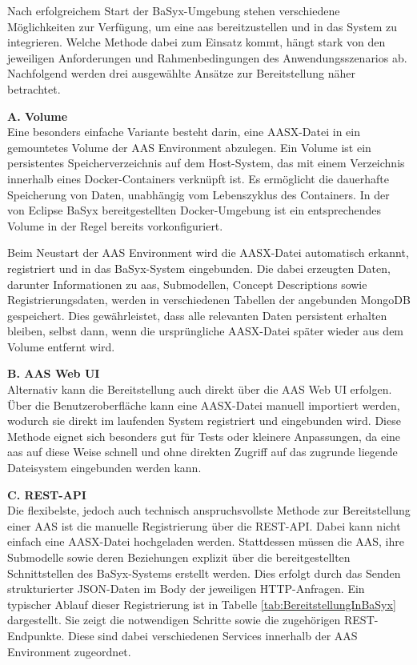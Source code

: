 Nach erfolgreichem Start der BaSyx-Umgebung stehen verschiedene Möglichkeiten zur Verfügung, um eine \acs{aas} bereitzustellen und in das System zu integrieren. 
Welche Methode dabei zum Einsatz kommt, hängt stark von den jeweiligen Anforderungen und Rahmenbedingungen des Anwendungsszenarios ab.
Nachfolgend werden drei ausgewählte Ansätze zur Bereitstellung näher betrachtet.

\noindent\textbf{A. Volume}\\
Eine besonders einfache Variante besteht darin, eine AASX-Datei in ein gemountetes Volume der AAS Environment abzulegen.
Ein Volume ist ein persistentes Speicherverzeichnis auf dem Host-System, das mit einem Verzeichnis innerhalb eines Docker-Containers verknüpft ist.
Es ermöglicht die dauerhafte Speicherung von Daten, unabhängig vom Lebenszyklus des Containers.
In der von Eclipse BaSyx bereitgestellten Docker-Umgebung ist ein entsprechendes Volume in der Regel bereits vorkonfiguriert.

Beim Neustart der AAS Environment wird die AASX-Datei automatisch erkannt, registriert und in das BaSyx-System eingebunden.
Die dabei erzeugten Daten, darunter Informationen zu \acs{aas}, Submodellen, Concept Descriptions sowie Registrierungsdaten, werden in verschiedenen Tabellen der angebunden MongoDB gespeichert.
Dies gewährleistet, dass alle relevanten Daten persistent erhalten bleiben, selbst dann, wenn die ursprüngliche AASX-Datei später wieder aus dem Volume entfernt wird.

\noindent\textbf{B. AAS Web UI}\\
Alternativ kann die Bereitstellung auch direkt über die AAS Web UI erfolgen.
Über die Benutzeroberfläche kann eine AASX-Datei manuell importiert werden, wodurch sie direkt im laufenden System registriert und eingebunden wird.
Diese Methode eignet sich besonders gut für Tests oder kleinere Anpassungen, da eine \acs{aas} auf diese Weise schnell und ohne direkten Zugriff auf das zugrunde liegende Dateisystem eingebunden werden kann.

\noindent\textbf{C. REST-API}\\
Die flexibelste, jedoch auch technisch anspruchsvollste Methode zur Bereitstellung einer AAS ist die manuelle Registrierung über die REST-API. 
Dabei kann nicht einfach eine AASX-Datei hochgeladen werden. 
Stattdessen müssen die AAS, ihre Submodelle sowie deren Beziehungen explizit über die bereitgestellten Schnittstellen des BaSyx-Systems erstellt werden. 
Dies erfolgt durch das Senden strukturierter JSON-Daten im Body der jeweiligen HTTP-Anfragen.
Ein typischer Ablauf dieser Registrierung ist in Tabelle \ref{tab:BereitstellungInBaSyx} dargestellt. 
Sie zeigt die notwendigen Schritte sowie die zugehörigen REST-Endpunkte.
Diese sind dabei verschiedenen Services innerhalb der AAS Environment zugeordnet.

